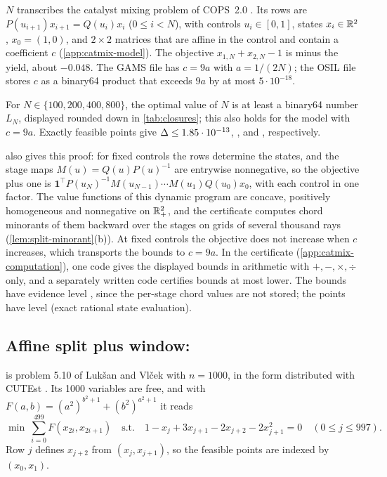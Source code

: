 $N$ transcribes the catalyst mixing problem of COPS~2.0 \citep{dolan2001-benchmarking-optimization-software-with-cops}.
Its rows are $P(u_{i+1})x_{i+1}=Q(u_i)x_i$ ($0\le i<N$), with controls $u_i\in[0,1]$, states $x_i\in\mathbb{R}^2$, $x_0=(1,0)$, and $2\times2$ matrices that are affine in the control and contain a coefficient $c$ (\cref{app:catmix-model}).
The objective $x_{1,N}+x_{2,N}-1$ is minus the yield, about $-0.048$.
The GAMS file has $c=9a$ with $a=1/(2N)$; the OSIL file stores $c$ as a binary64 product that exceeds $9a$ by at most $5\cdot10^{-18}$.

\begin{theorem}\label{thm:catmix-bound}
For $N\in\{100,200,400,800\}$, the optimal value of $N$ is at least a binary64 number $L_N$, displayed rounded down in \cref{tab:closures}; this also holds for the model with $c=9a$.
Exactly feasible points give $\Delta\le1.85\cdot 10^{-13}$, ,  and , respectively.
\end{theorem}

 also gives this proof: for fixed controls the rows determine the states, and the stage maps $M(u)=Q(u)P(u)^{-1}$ are entrywise nonnegative, so the objective plus one is $\mathbf 1^\top P(u_N)^{-1}M(u_{N-1})\cdots M(u_1)Q(u_0)x_0$, with each control in one factor.
The value functions of this dynamic program are concave, positively homogeneous and nonnegative on $\mathbb{R}^2_+$, and the certificate computes chord minorants of them backward over the stages on grids of several thousand rays (\cref{lem:split-minorant}(b)).
At fixed controls the objective does not increase when $c$ increases, which transports the bounds to $c=9a$.
In the certificate (\cref{app:catmix-computation}), one code gives the displayed bounds in arithmetic  with $+,-,\times,\div$ only, and a separately written code certifies bounds at most  lower.
The bounds have evidence level , since the per-stage chord values are not stored; the points have level  (exact rational state evaluation).

\subsection{Affine split plus window: }\label{sec:split-window}

 is problem 5.10 of Luk\v{s}an and Vl\v{c}ek with $n=1000$, in the form distributed with CUTEst \citep{gould2015-cutest-a-constrained-and-unconstrained,luksan2026-cutest-source-forms-for-dtoc5}.
Its 1000 variables are free, and with $F(a,b)=(a^2)^{b^2+1}+(b^2)^{a^2+1}$ it reads
\[
  \min\ \sum_{i=0}^{499}F(x_{2i},x_{2i+1})\quad\text{s.t.}\quad 1-x_j+3x_{j+1}-2x_{j+2}-2x_{j+1}^2=0\quad(0\le j\le997).
\]
Row $j$ defines $x_{j+2}$ from $(x_j,x_{j+1})$, so the feasible points are indexed by $(x_0,x_1)$.

